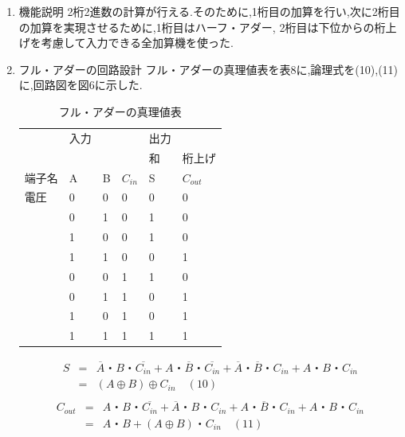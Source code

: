 \documentclass[twocolumn, 10pt,a4j]{jsarticle}
\begin{document}
    \begin{enumerate}
    \item 機能説明
      2桁2進数の計算が行える.そのために,1桁目の加算を行い,次に2桁目の加算を実現させるために,1桁目はハーフ・アダー,
      2桁目は下位からの桁上げを考慮して入力できる全加算機を使った.
    \item フル・アダーの回路設計
      フル・アダーの真理値表を表8に,論理式を(10),(11)に,回路図を図6に示した.
      \begin{table}[H]
        \centering
        \caption{フル・アダーの真理値表}
        \label{my-label}
        \begin{tabular}{l|lll|ll}
            & 入力 &   &          & 出力 &           \\ \cline{5-6} 
            &    &   &          & 和  & 桁上げ       \\ \hline
        端子名 & A  & B & $C_{in}$ & S  & $C_{out}$ \\ \hline
        電圧  & 0  & 0 & 0        & 0  & 0         \\
            & 0  & 1 & 0        & 1  & 0         \\
            & 1  & 0 & 0        & 1  & 0         \\
            & 1  & 1 & 0        & 0  & 1         \\
            & 0  & 0 & 1        & 1  & 0         \\
            & 0  & 1 & 1        & 0  & 1         \\
            & 1  & 0 & 1        & 0  & 1         \\
            & 1  & 1 & 1        & 1  & 1        
        \end{tabular}
      \end{table}
      \begin{center}
        \begin{eqnarray*}
          S &=& \overline{A}・B・\overline{C_{in}} + A・\overline{B}・\overline{C_{in}}
           + \overline{A}・\overline{B}・C_{in} + A・B・C_{in} \\
          &=& (A \oplus B) \oplus C_{in} \quad(10) \\
        \end{eqnarray*}
        \begin{eqnarray*}
          C_{out} &=& A・B・\overline{C_{in}} + \overline{A}・B・C_{in}
           + A・\overline{B}・C_{in} + A・B・C_{in} \\
          &=& A・B + (A \oplus B)・C_{in} \quad(11) \\

\end{eqnarray*}
\end{center}
\end{enumerate}
\end{document}
